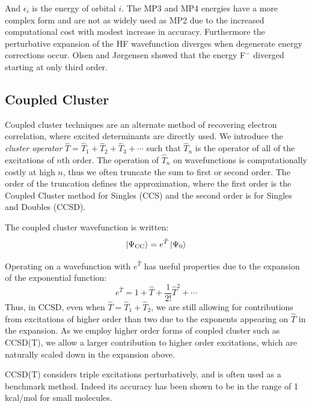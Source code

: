 And $\epsilon_i$ is the energy of orbital $i$. The MP3 and MP4 energies have a more complex form and are not as widely used as MP2 due to the increased computational cost with modest increase in accuracy. Furthermore the perturbative expansion of the HF wavefunction diverges when degenerate energy corrections occur. Olsen and J\o{}rgensen showed that the energy F$^-$ diverged starting at only third order.\cite{Olsen2000}

\subsection{Coupled Cluster}

Coupled cluster techniques are an alternate method of recovering electron correlation, where excited determinants are directly used. We introduce the \textit{cluster operator} $\hat{T} = \hat{T}_1 + \hat{T}_2 + \hat{T}_3 + \cdots$ such that $\hat{T}_n$ is the operator of all of the excitations of $n$th order. The operation of $\hat{T}_n$ on wavefunctions is computationally costly at high $n$, thus we often truncate the sum to first or second order. The order of the truncation defines the approximation, where the first order is the Coupled Cluster method for Singles (CCS) and the second order is for Singles and Doubles (CCSD).

The coupled cluster wavefunction is written:\cite{cizek1966}
\begin{equation}
    \ket{\Psi_{\text{CC}}} = e^{\hat{T}} \ket{\Psi_0}
\end{equation}

Operating on a wavefunction with $e^{\hat{T}}$ has useful properties due to the expansion of the exponential function:
\begin{equation}
    e^{\hat{T}} = 1 + \hat{T} + \frac{1}{2!}\hat{T}^2 + \cdots
\end{equation}
Thus, in CCSD, even when $\hat{T} = \hat{T}_1 + \hat{T}_2$, we are still allowing for contributions from excitations of higher order than two due to the exponents appearing on $\hat{T}$ in the expansion. As we employ higher order forms of coupled cluster such as CCSD(T), we allow a larger contribution to higher order excitations, which are naturally scaled down in the expansion above.

CCSD(T) considers triple excitations perturbatively, and is often used as a benchmark method. Indeed its accuracy has been shown to be in the range of 1 kcal/mol for small molecules.\cite{Feller2001}

